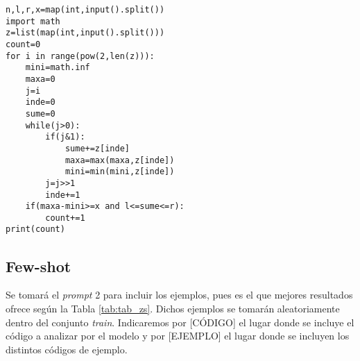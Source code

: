 \documentclass[12pt,twoside]{article}
\begin{document}
\begin{tcolorbox}[
  colback=gray!5,
  colframe=black,
  boxrule=0.5pt,
  breakable,
  title=Exponencial catalogado correctamente,
]
\begin{verbatim}
n,l,r,x=map(int,input().split())
import math
z=list(map(int,input().split()))
count=0
for i in range(pow(2,len(z))):
    mini=math.inf
    maxa=0
    j=i
    inde=0
    sume=0
    while(j>0):
        if(j&1):
            sume+=z[inde]
            maxa=max(maxa,z[inde])
            mini=min(mini,z[inde])
        j=j>>1
        inde+=1
    if(maxa-mini>=x and l<=sume<=r):
        count+=1
print(count)
\end{verbatim}
\end{tcolorbox}

\subsection{Few-shot}

Se tomará el \textit{prompt} 2 para incluir los ejemplos, pues es el que mejores resultados ofrece según la Tabla \ref{tab:tab_zs}. Dichos ejemplos se tomarán aleatoriamente dentro del conjunto \textit{train}. Indicaremos por [CÓDIGO] el lugar donde se incluye el código a analizar por el modelo y por [EJEMPLO] el lugar donde se incluyen los distintos códigos de ejemplo.
\end{document}
